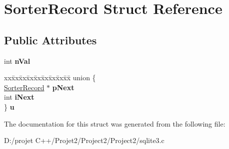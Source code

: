 \hypertarget{struct_sorter_record}{}\section{Sorter\+Record Struct Reference}
\label{struct_sorter_record}
\subsection*{Public Attributes}
\begin{DoxyCompactItemize}
\item 
\mbox{\label{struct_sorter_record_a2b8ffc0f8410826de8b41425759bf462}} 
int {\bfseries n\+Val}
\item 
\mbox{\label{struct_sorter_record_ab9e444e4355206b604a515bee5dd4e11}} 
\begin{tabbing}
xx\=xx\=xx\=xx\=xx\=xx\=xx\=xx\=xx\=\kill
union \{\\
\>\mbox{\hyperlink{struct_sorter_record}{SorterRecord}} $\ast$ {\bfseries pNext}\\
\>int {\bfseries iNext}\\
\} {\bfseries u}\\

\end{tabbing}\end{DoxyCompactItemize}


The documentation for this struct was generated from the following file\+:\begin{DoxyCompactItemize}
\item 
D\+:/projet C++/\+Projet2/\+Project2/\+Project2/sqlite3.\+c\end{DoxyCompactItemize}
